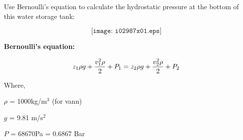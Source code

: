 

Use Bernoulli's equation to calculate the hydrostatic pressure at the bottom of this water storage tank:

$$\texttt{[image: i02987x01.eps]}$$

\noindent
{\bf Bernoulli's equation:}

$$z_1 \rho g + {v_1^2 \rho \over 2} + P_1 = z_2 \rho g + {v_2^2 \rho \over 2} + P_2$$

\vskip 10pt

\noindent
Where,

$\rho$ = 1000kg/m$^{3}$ (for vann)

$g$ = 9.81 m/s$^{2}$

\vskip 10pt







$P$ = 68670Pa = 0.6867 Bar










